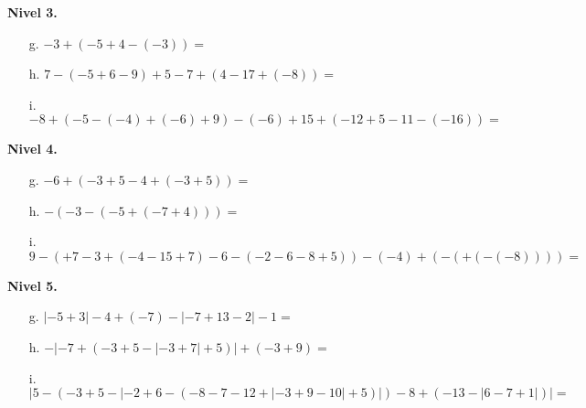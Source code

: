 \documentclass[spanish,letterpaper, 11pt, addpoints, answers]{exam}
\begin{document}
\begin{questions}
\textbf{Nivel 3.}\\
\begin{itemize}
\item[g.] $-3+(-5+4-(-3))=$

\item[h.] $7-(-5+6-9)+5-7+(4-17+(-8))=$

\item[i.] $-8+(-5-(-4)+(-6)+9)-(-6)+15+(-12+5-11-(-16))=$ 
\end{itemize}

\textbf{Nivel 4.}\\
\begin{itemize}
\item[g.] $-6+(-3+5-4+(-3+5))=$

\item[h.] $-(-3-(-5+(-7+4)))=$

\item[i.] $9-(+7-3+(-4-15+7)-6-(-2-6-8+5))-(-4)+(-(+(-(-8))))=$ 
\end{itemize}

\textbf{Nivel 5.}\\
\begin{itemize}
\item[g.] $|-5+3|-4+(-7)-|-7+13-2|-1=$

\item[h.] $-|-7+(-3+5-|-3+7|+5)|+(-3+9)=$

\item[i.] $|5-(-3+5-|-2+6-(-8-7-12+|-3+9-10|+5)|)-8+(-13-|6-7+1|)|=$ 
\end{itemize}

\end{questions}
\end{document}

